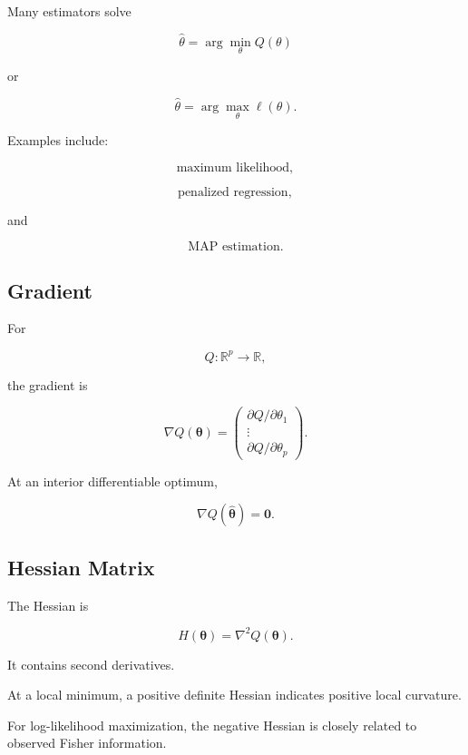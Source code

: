 Many estimators solve

\[
\boxed{
\widehat{\theta}
=
\arg\min_\theta
Q(\theta)
}
\]

or

\[
\boxed{
\widehat{\theta}
=
\arg\max_\theta
\ell(\theta).
}
\]

Examples include:

\[
\boxed{
\text{maximum likelihood},
}
\]

\[
\boxed{
\text{penalized regression},
}
\]

and

\[
\boxed{
\text{MAP estimation}.
}
\]

\subsection{Gradient}
\label{subsec:statistical-gradient}

For

\[
Q:
\mathbb{R}^p
\to
\mathbb{R},
\]

the gradient is

\[
\boxed{
\nabla Q(\boldsymbol{\theta})
=
\begin{pmatrix}
\partial Q/\partial\theta_1\\
\vdots\\
\partial Q/\partial\theta_p
\end{pmatrix}.
}
\]

At an interior differentiable optimum,

\[
\boxed{
\nabla Q(\widehat{\boldsymbol{\theta}})
=
\mathbf{0}.
}
\]

\subsection{Hessian Matrix}
\label{subsec:statistical-hessian}

The Hessian is

\[
\boxed{
H(\boldsymbol{\theta})
=
\nabla^2
Q(\boldsymbol{\theta}).
}
\]

It contains second derivatives.

At a local minimum, a positive definite Hessian indicates positive local
curvature.

For log-likelihood maximization, the negative Hessian is closely related
to observed Fisher information.


